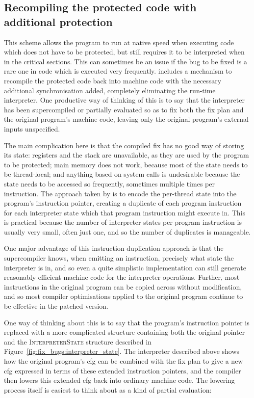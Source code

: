 \subsection{Recompiling the protected code with additional protection}

This scheme allows the program to run at native speed when executing
code which does not have to be protected, but still requires it to be
interpreted when in the critical sections.  This can sometimes be an
issue if the bug to be fixed is a rare one in code which is executed
very frequently.  {\Implementation} includes a mechanism to recompile
the protected code back into machine code with the necessary
additional synchronisation added, completely eliminating the run-time
interpreter.  One productive way of thinking of this is to say that
the interpreter has been supercompiled\cite{Sorensen2008} or partially
evaluated\cite{Jones1993} so as to fix both the fix plan and the
original program's machine code, leaving only the original program's
external inputs unspecified.

The main complication here is that the compiled fix has no good way of
storing its state: registers and the stack are unavailable, as they
are used by the program to be protected; main memory does not work,
because most of the state needs to be thread-local; and anything based
on system calls is undesirable because the state needs to be accessed
so frequently, sometimes multiple times per instruction.  The approach
taken by {\implementation} is to encode the per-thread state into the
program's instruction pointer, creating a duplicate of each program
instruction for each interpreter state which that program instruction
might execute in.  This is practical because the number of interpreter
states per program instruction is usually very small, often just one,
and so the number of duplicates is manageable.

One major advantage of this instruction duplication approach is that
the supercompiler knows, when emitting an instruction, precisely what
state the interpreter is in, and so even a quite simplistic
implementation can still generate reasonably efficient machine code
for the interpreter operations.  Further, most instructions in the
original program can be copied across without modification, and so
most compiler optimisations applied to the original program continue
to be effective in the patched version.

One way of thinking about this is to say that the program's
instruction pointer is replaced with a more complicated structure
containing both the original pointer and the \textsc{InterpreterState}
structure described in Figure~\ref{fig:fix_bugs:interpreter_state}.
The interpreter described above shows how the original program's \gls{cfg}
can be combined with the fix plan to give a new \gls{cfg} expressed in terms
of these extended instruction pointers, and the compiler then lowers
this extended \gls{cfg} back into ordinary machine code.  The lowering
process itself is easiest to think about as a kind of partial
evaluation:

